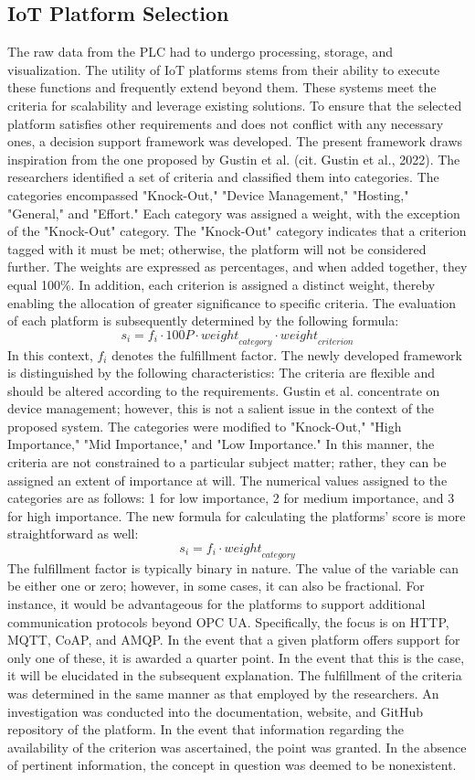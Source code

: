 \subsection{IoT Platform Selection} 
The raw data from the PLC had to undergo processing, storage, and visualization. The utility of IoT platforms stems from their ability to execute these functions and frequently extend beyond them.  These systems meet the criteria for scalability and leverage existing solutions. To ensure that the selected platform satisfies other requirements and does not conflict with any necessary ones, a decision support framework was developed. The present framework draws inspiration from the one proposed by Gustin et al. (cit. Gustin et al., 2022). The researchers identified a set of criteria and classified them into categories. The categories encompassed "Knock-Out," "Device Management," "Hosting," "General," and "Effort." Each category was assigned a weight, with the exception of the "Knock-Out" category. The "Knock-Out" category indicates that a criterion tagged with it must be met; otherwise, the platform will not be considered further. The weights are expressed as percentages, and when added together, they equal 100\%. In addition, each criterion is assigned a distinct weight, thereby enabling the allocation of greater significance to specific criteria. The evaluation of each platform is subsequently determined by the following formula:
\[ s_i = f_i \cdot 100P \cdot \mathit{weight}_{category} \cdot \mathit{weight}_{criterion} \]
In this context, $f_i$ denotes the fulfillment factor.
The newly developed framework is distinguished by the following characteristics: The criteria are flexible and should be altered according to the requirements. Gustin et al. concentrate on device management; however, this is not a salient issue in the context of the proposed system. The categories were modified to "Knock-Out," "High Importance," "Mid Importance," and "Low Importance." In this manner, the criteria are not constrained to a particular subject matter; rather, they can be assigned an extent of importance at will. The numerical values assigned to the categories are as follows: 1 for low importance, 2 for medium importance, and 3 for high importance. The new formula for calculating the platforms' score is more straightforward as well:
\[ s_i = f_i \cdot \mathit{weight}_{category} \]
The fulfillment factor is typically binary in nature. The value of the variable can be either one or zero; however, in some cases, it can also be fractional. For instance, it would be advantageous for the platforms to support additional communication protocols beyond OPC UA. Specifically, the focus is on HTTP, MQTT, CoAP, and AMQP. In the event that a given platform offers support for only one of these, it is awarded a quarter point. In the event that this is the case, it will be elucidated in the subsequent explanation. The fulfillment of the criteria was determined in the same manner as that employed by the researchers. An investigation was conducted into the documentation, website, and GitHub repository of the platform. In the event that information regarding the availability of the criterion was ascertained, the point was granted. In the absence of pertinent information, the concept in question was deemed to be nonexistent.
